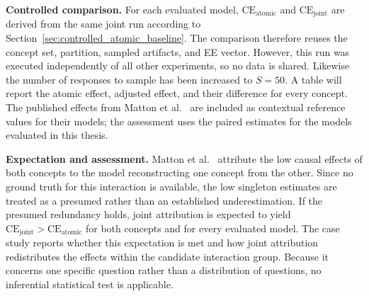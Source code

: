 \noindent\textbf{Controlled comparison.} For each evaluated model, $\mathrm{CE}_{\mathrm{atomic}}$ and $\mathrm{CE}_{\mathrm{joint}}$ are derived from the same joint run according to Section~\ref{sec:controlled_atomic_baseline}. The comparison therefore reuses the concept set, partition, sampled artifacts, and EE vector. However, this run was executed independently of all other experiments, so no data is shared. Likewise the number of responses to sample has been increased to $S=50$. A table will report the atomic effect, adjusted effect, and their difference for every concept. The published effects from Matton et al.~\cite{mattonWalkTalkMeasuring2024} are included as contextual reference values for their models; the assessment uses the paired estimates for the models evaluated in this thesis.

\noindent\textbf{Expectation and assessment.} Matton et al.~\cite{mattonWalkTalkMeasuring2024} attribute the low causal effects of both concepts to the model reconstructing one concept from the other. Since no ground truth for this interaction is available, the low singleton estimates are treated as a presumed rather than an established underestimation. If the presumed redundancy holds, joint attribution is expected to yield $\mathrm{CE}_{\mathrm{joint}} > \mathrm{CE}_{\mathrm{atomic}}$ for both concepts and for every evaluated model. The case study reports whether this expectation is met and how joint attribution redistributes the effects within the candidate interaction group. Because it concerns one specific question rather than a distribution of questions, no inferential statistical test is applicable.
